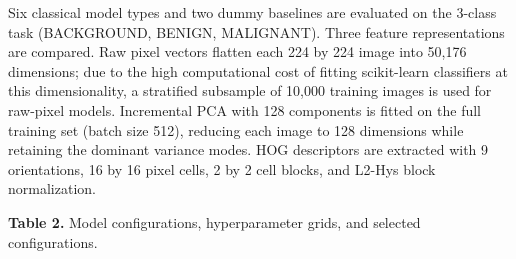 \documentclass[justified,notoc,openany]{tufte-book}
\begin{document}
Six classical model types and two dummy baselines are evaluated on the 3-class task (BACKGROUND, BENIGN, MALIGNANT). Three feature representations are compared. Raw pixel vectors flatten each 224 by 224 image into 50,176 dimensions; due to the high computational cost of fitting scikit-learn classifiers at this dimensionality, a stratified subsample of 10,000 training images is used for raw-pixel models. Incremental PCA with 128 components is fitted on the full training set (batch size 512), reducing each image to 128 dimensions while retaining the dominant variance modes. HOG descriptors are extracted with 9 orientations, 16 by 16 pixel cells, 2 by 2 cell blocks, and L2-Hys block normalization.

\textbf{Table 2.} Model configurations, hyperparameter grids, and selected configurations.
\end{document}
